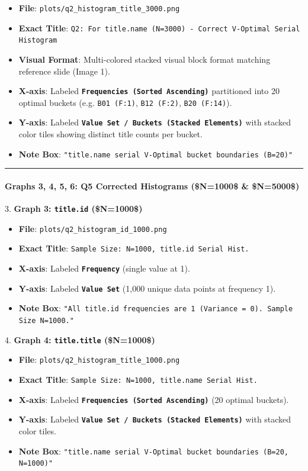 \documentclass[11pt,a4paper]{article}
\begin{document}
\begin{itemize}
\item \textbf{File}: \texttt{plots/q2\_histogram\_title\_3000.png}
\item \textbf{Exact Title}: \texttt{Q2: For title.name (N=3000) - Correct V-Optimal Serial Histogram}
\item \textbf{Visual Format}: Multi-colored stacked visual block format matching reference slide (Image 1).
\item \textbf{X-axis}: Labeled \textbf{\texttt{Frequencies (Sorted Ascending)}} partitioned into 20 optimal buckets (e.g. \texttt{B01 (F:1)}, \texttt{B12 (F:2)}, \texttt{B20 (F:14)}).
\item \textbf{Y-axis}: Labeled \textbf{\texttt{Value Set / Buckets (Stacked Elements)}} with stacked color tiles showing distinct title counts per bucket.
\item \textbf{Note Box}: \texttt{"title.name serial V-Optimal bucket boundaries (B=20)"}
\end{itemize}

\hrule


\paragraph{\textbf{Graphs 3, 4, 5, 6: Q5 Corrected Histograms (\$N=1000\$ \& \$N=5000\$)}}

3. \textbf{Graph 3: \texttt{title.id} (\$N=1000\$)}

\begin{itemize}
\item \textbf{File}: \texttt{plots/q2\_histogram\_id\_1000.png}
\item \textbf{Exact Title}: \texttt{Sample Size: N=1000, title.id Serial Hist.}
\item \textbf{X-axis}: Labeled \textbf{\texttt{Frequency}} (single value at 1).
\item \textbf{Y-axis}: Labeled \textbf{\texttt{Value Set}} (1,000 unique data points at frequency 1).
\item \textbf{Note Box}: \texttt{"All title.id frequencies are 1 (Variance = 0). Sample Size N=1000."}
\end{itemize}

4. \textbf{Graph 4: \texttt{title.title} (\$N=1000\$)}

\begin{itemize}
\item \textbf{File}: \texttt{plots/q2\_histogram\_title\_1000.png}
\item \textbf{Exact Title}: \texttt{Sample Size: N=1000, title.name Serial Hist.}
\item \textbf{X-axis}: Labeled \textbf{\texttt{Frequencies (Sorted Ascending)}} (20 optimal buckets).
\item \textbf{Y-axis}: Labeled \textbf{\texttt{Value Set / Buckets (Stacked Elements)}} with stacked color tiles.
\item \textbf{Note Box}: \texttt{"title.name serial V-Optimal bucket boundaries (B=20, N=1000)"}
\end{itemize}
\end{document}
